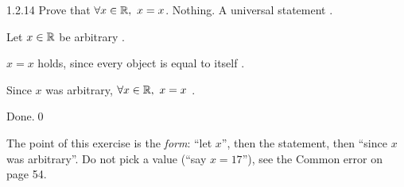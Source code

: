 \begin{bookex}[bonus]{1.2.14}
Prove that $\forall x\in\mathbb{R},\ x=x$.
\solution
\given Nothing.
\goal A universal statement .
\begin{steps}
\item Let $x\in\mathbb{R}$ be arbitrary .
\item $x=x$ holds, since every object is equal to itself .
\item Since $x$ was arbitrary, $\forall x\in\mathbb{R},\ x=x$ .
\end{steps}
\conclusion Done.\qed
\begin{compare}
\item The point of this exercise is the \emph{form}: ``let $x$'', then the statement, then ``since $x$ was arbitrary''. Do not pick a value (``say $x=17$''), see the Common error on page 54.
\end{compare}
\end{bookex}


